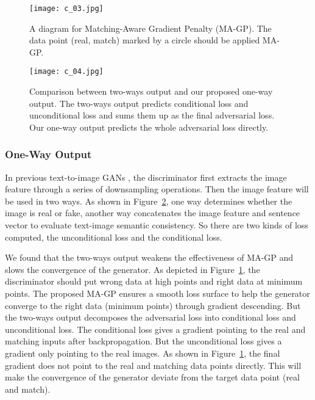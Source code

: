 \documentclass[10pt,twocolumn,letterpaper]{article}
\begin{document}
\begin{figure}[t] \small
  \centering
  \texttt{[image: c\_03.jpg]}
  \caption{A diagram for Matching-Aware Gradient Penalty (MA-GP). The data point (real, match) marked by a circle should be applied MA-GP.}
  \label{fig3}
  \vspace{-0.4cm}
\end{figure}

\begin{figure}[t] \small
  \centering
  \texttt{[image: c\_04.jpg]}
  \caption{Comparison between two-ways output and our proposed one-way output. The two-ways output predicts conditional loss and unconditional loss and sums them up as the final adversarial loss. Our one-way output predicts the whole adversarial loss directly.}
  \label{fig4}
    \vspace{-0.4cm}
\end{figure}


\subsubsection{One-Way Output}

In previous text-to-image GANs \cite{zhang2017stackgan,zhang2018stackgan,xu2018attngan}, the discriminator first extracts the image feature through a series of downsampling operations. 
Then the image feature will be used in two ways. 
As shown in Figure~\ref{fig4}, one way determines whether the image is real or fake, another way concatenates the image feature and sentence vector to evaluate text-image semantic consistency. 
So there are two kinds of loss computed, the unconditional loss and the conditional loss. 

We found that the two-ways output weakens the effectiveness of MA-GP and slows the convergence of the generator. 
As depicted in Figure~\ref{fig3}, the discriminator should put wrong data at high points and right data at minimum points. 
The proposed MA-GP ensures a smooth loss surface to help the generator converge to the right data (minimum points) through gradient descending. 
But the two-ways output decomposes the adversarial loss into conditional loss and unconditional loss. 
The conditional loss gives a gradient  pointing to the real and matching inputs after backpropagation. 
But the unconditional loss gives a gradient  only pointing to the real images. 
As shown in Figure~\ref{fig3}, the final gradient  does not point to the real and matching data points directly. 
This will make the convergence of the generator deviate from the target data point (real and match). 
\end{document}
